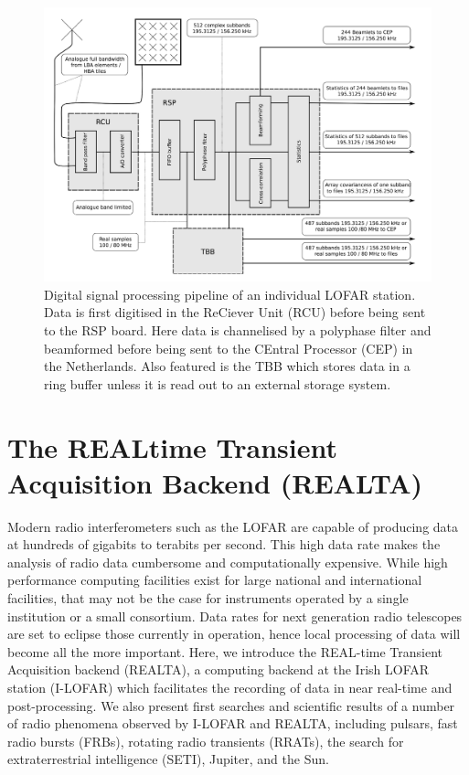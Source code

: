 \begin{figure}
    \centering
    \includegraphics[width=0.75\columnwidth]{Images/Digital_signal_processing.png}
    \caption[Digital signal processing pipeline of an individual LOFAR station.]{Digital signal processing pipeline of an individual LOFAR station. Data is first digitised in the ReCiever Unit (RCU) before being sent to the RSP board. Here data is channelised by a polyphase filter and beamformed before being sent to the CEntral Processor (CEP) in the Netherlands. Also featured is the TBB which stores data in a ring buffer unless it is read out to an external storage system. }
    \label{fig:sig_pipe}
\end{figure}

\section{The REALtime Transient Acquisition Backend (REALTA)}
Modern radio interferometers such as the LOFAR are capable of producing data at hundreds of gigabits to terabits per second. This high data rate makes the analysis of radio data cumbersome and computationally expensive. While high performance computing facilities exist for large national and international facilities, that may not be the case for instruments operated by a single institution or a small consortium. 
Data rates for next generation radio telescopes are set to eclipse those currently in operation, hence local processing of data will become all the more important.
Here, we introduce the REAL-time Transient Acquisition backend (REALTA), a computing backend at the Irish LOFAR station (I-LOFAR) which facilitates the recording of data in near real-time and post-processing. We also present first searches and scientific results of a number of radio phenomena observed by I-LOFAR and REALTA, including pulsars, fast radio bursts (FRBs), rotating radio transients (RRATs), the search for extraterrestrial intelligence (SETI), Jupiter, and the Sun.


